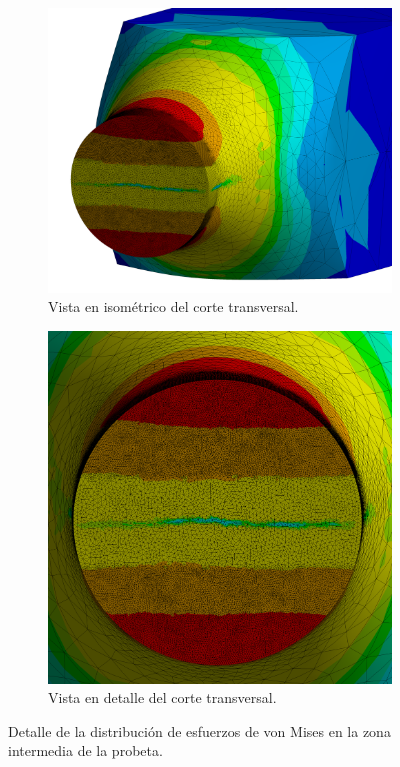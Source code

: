 \begin{figure}[]
	\ContinuedFloat
	\centering
	\begin{subfigure}{0.6\linewidth}
		\centering
		\includegraphics[width=\linewidth]{Imagenes/rcorte_iso.png}
		\caption{Vista en isométrico del corte transversal.}
		\label{fig:rcorte_iso}
	\end{subfigure}		
	\begin{subfigure}{0.6\linewidth}
		\centering
		\includegraphics[width=\linewidth]{Imagenes/rcorte.png}
		\caption{Vista en detalle del corte transversal.}
		\label{fig:rcorte}
	\end{subfigure}
\caption{Detalle de la distribución de esfuerzos de von Mises en la zona intermedia de la probeta.}
\label{fig:resultados_vm}
\end{figure}

